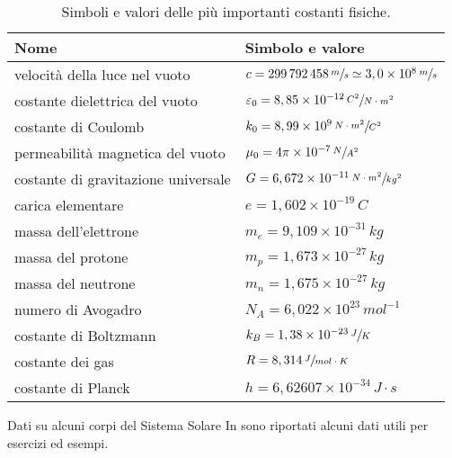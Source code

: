 \documentclass[a4paper,11pt,italian]{article}
\begin{document}
\begin{description}
  \begin{table}[htp]\centering
    \begin{tabular}{ll}\toprule
      \textbf{Nome} & \textbf{Simbolo e valore}\\\midrule
      velocità della luce nel vuoto & $ c = 299\,  792\, 458\,	\sfrac{m}{s} \simeq 3,0 \times 10^8 \,	\sfrac{m}{s} $ \\\addlinespace[.2em]
      costante dielettrica del vuoto & $ \varepsilon_0 = 8,85\times 10^{-12} \, \sfrac{C^2}{N \cdot m^2} $ \\\addlinespace[.2em]
      costante di Coulomb & $ k_0 = 8,99 \times 10^9 \, \sfrac{N \cdot m^2}{C^2} $ \\\addlinespace[.2em]
      permeabilità magnetica del vuoto & $ \mu_0 = 4\pi \times 10^{-7} \, \sfrac{N}{A^2} $ \\\addlinespace[.2em]
      costante di gravitazione universale & $ G = 6,672 \times 10^{-11} \, \sfrac{N \cdot m^2}{kg^2} $ \\\addlinespace[.2em]
      carica elementare & $ e = 1,602 \times 10^{-19} \, C $ \\\addlinespace[.2em]
      massa dell'elettrone & $ m_e = 9,109 \times 10^{-31} \, kg $ \\\addlinespace[.2em]
      massa del protone & $ m_p = 1,673 \times 10^{-27} \, kg $ \\\addlinespace[.2em]
      massa del neutrone & $ m_n = 1,675 \times 10^{-27} \, kg $ \\\addlinespace[.2em]
      numero di Avogadro & $ N_A = 6,022 \times 10^{23} \, mol^{-1} $ \\\addlinespace[.2em]
      costante di Boltzmann & $ k_B = 1,38 \times 10^{-23} \, \sfrac{J}{K} $ \\\addlinespace[.2em]
      costante dei gas & $ R = 8,314 \, \sfrac{J}{mol \cdot K} $ \\\addlinespace[.2em]
      costante di Planck & $ h = 6,62607 \times 10^{-34} \, J\cdot s $ \\\bottomrule
    \end{tabular}
  \caption{Simboli e valori delle più importanti costanti fisiche.}
    \label{tab:costantimportanti}
  \end{table}  

\begin{soloscientifico} %
  \item[Dati su alcuni corpi del Sistema Solare]
  In  sono riportati alcuni dati utili per esercizi ed esempi.


\end{soloscientifico}
\end{description}
\end{document}
